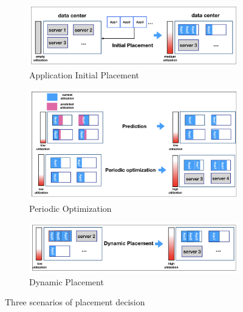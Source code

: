 \begin{figure}
	\centering
	\begin{subfigure}[b]{0.9\textwidth}
		\includegraphics[width=\textwidth]{pics/initial_placement.png}
		\caption{Application Initial Placement}
	\end{subfigure}
	\begin{subfigure}[b]{0.9\textwidth}
		\includegraphics[width=\textwidth]{pics/periodic_optimization.png}
	\caption{Periodic Optimization}
	\end{subfigure}
	\begin{subfigure}[b]{0.9\textwidth}
		\includegraphics[width=\textwidth]{pics/dynamic_placement.png}
	\caption{Dynamic Placement}
	\end{subfigure}
	\caption{Three scenarios of placement decision}
	\label{fig:management}
\end{figure}


